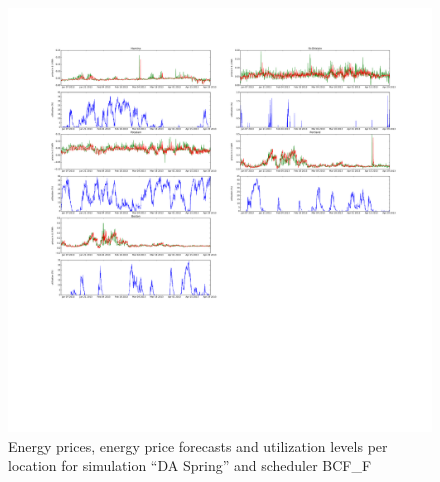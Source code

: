\begin{figure}[htbp]
	\centering
	\vspace*{-0.6in}
	\hspace*{-1.4in}
		\includegraphics[width=1.60\textwidth]{figures/appendix_simulation_results/DA_Spring_scenario_3.pdf}
	\vspace*{-2.8in}
	\caption{Energy prices, energy price forecasts and utilization levels per location for simulation ``DA Spring'' and scheduler BCF\_F}
	\label{fig:app_DA_Spring_scenario_3}
\end{figure}

